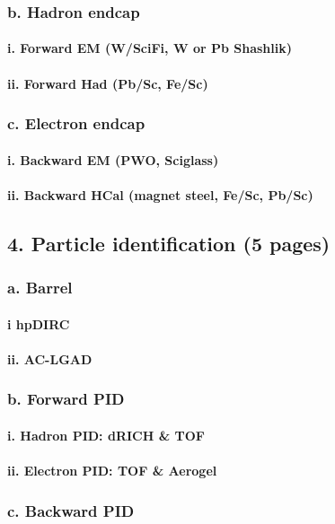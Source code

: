 \documentclass{report}
\begin{document}
\subsubsection{b. Hadron endcap}
\paragraph{i. Forward EM (W/SciFi, W or Pb Shashlik)}
\paragraph{ii. Forward Had (Pb/Sc, Fe/Sc)}
\subsubsection{c. Electron endcap}
\paragraph{i. Backward EM (PWO, Sciglass)}
\paragraph{ii. Backward HCal (magnet steel, Fe/Sc, Pb/Sc)}
\subsection{4. Particle identification (5 pages)}
\subsubsection{a. Barrel}
\paragraph{i hpDIRC}
\paragraph{ii. AC-LGAD}
\subsubsection{b. Forward PID}
\paragraph{i. Hadron PID: dRICH \& TOF}
\paragraph{ii. Electron PID: TOF \& Aerogel}
\subsubsection{c. Backward PID}
\end{document}
